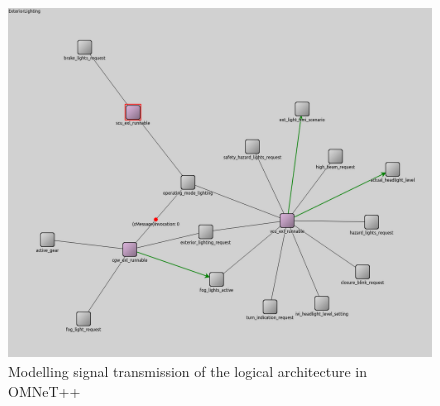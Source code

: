 \begin{figure}[htb]
    \centering
    \includegraphics[width=\textwidth]{images/logical_sim.png}
    \caption{Modelling signal transmission of the logical architecture in OMNeT++}
    \label{fig:logical_sim}
\end{figure}